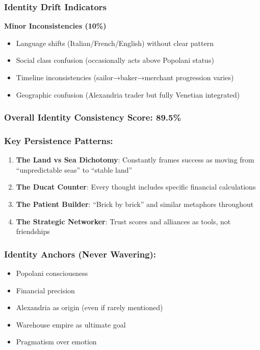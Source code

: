 \documentclass[11pt,a4paper]{article}
\begin{document}
\subsubsection{Identity Drift Indicators}

\textbf{Minor Inconsistencies (10\%)}
\begin{itemize}
\item Language shifts (Italian/French/English) without clear pattern
\item Social class confusion (occasionally acts above Popolani status)
\item Timeline inconsistencies (sailor→baker→merchant progression varies)
\item Geographic confusion (Alexandria trader but fully Venetian integrated)
\end{itemize}

\subsubsection{Overall Identity Consistency Score: \textbf{89.5\%}}

\subsubsection{Key Persistence Patterns:}

\begin{enumerate}
\item \textbf{The Land vs Sea Dichotomy}: Constantly frames success as moving from ``unpredictable seas'' to ``stable land''
\item \textbf{The Ducat Counter}: Every thought includes specific financial calculations
\item \textbf{The Patient Builder}: ``Brick by brick'' and similar metaphors throughout
\item \textbf{The Strategic Networker}: Trust scores and alliances as tools, not friendships
\end{enumerate}

\subsubsection{Identity Anchors (Never Wavering):}

\begin{itemize}
\item Popolani consciousness
\item Financial precision
\item Alexandria as origin (even if rarely mentioned)
\item Warehouse empire as ultimate goal
\item Pragmatism over emotion
\end{itemize}
\end{document}
